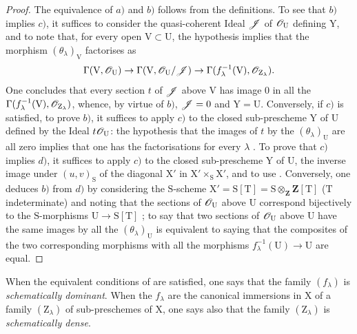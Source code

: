 \begin{proof}
The equivalence of $a)$ and $b)$ follows from the definitions.
To see that $b)$ implies $c)$, it suffices to consider the quasi-coherent Ideal $\mathscr{J}$ of $\mathscr{O}_\mathrm{U}$ defining $\mathrm{Y}$, and to note that, for every open $\mathrm{V}\subset\mathrm{U}$, the hypothesis implies that the morphism $(\theta_\lambda)_\mathrm{V}$ factorises as
\[
  \Gamma(\mathrm{V},\mathscr{O}_\mathrm{U})\to\Gamma(\mathrm{V},\mathscr{O}_\mathrm{U}/\mathscr{J})\to\Gamma(f_\lambda^{-1}(\mathrm{V}),\mathscr{O}_{\mathrm{Z}_\lambda}).
\]
One concludes that every section $t$ of $\mathscr{J}$ above $\mathrm{V}$ has image $0$ in all the $\Gamma(f_\lambda^{-1}(\mathrm{V}),\mathscr{O}_{\mathrm{Z}_\lambda})$, whence, by virtue of $b)$, $\mathscr{J}=0$ and $\mathrm{Y}=\mathrm{U}$.
Conversely, if $c)$ is satisfied, to prove $b)$, it suffices to apply $c)$ to the closed sub-prescheme $\mathrm{Y}$ of $\mathrm{U}$ defined by the Ideal $t\mathscr{O}_\mathrm{U}$: the hypothesis that the images of $t$ by the $(\theta_\lambda)_\mathrm{U}$ are all zero implies that one has the factorisations  for every $\lambda$ .
To prove that $c)$ implies $d)$, it suffices to apply $c)$ to the closed sub-prescheme $\mathrm{Y}$ of $\mathrm{U}$, the inverse image under $(u,v)_\mathrm{S}$ of the diagonal $\mathrm{X}'$ in $\mathrm{X}'\times_\mathrm{S}\mathrm{X}'$, and to use .
Conversely, one deduces $b)$ from $d)$ by considering the $\mathrm{S}$-scheme $\mathrm{X}'=\mathrm{S}[\mathrm{T}]=\mathrm{S}\otimes_\mathbf{Z}\mathbf{Z}[\mathrm{T}]$ ($\mathrm{T}$ indeterminate) and noting that the sections of $\mathscr{O}_\mathrm{U}$ above $\mathrm{U}$ correspond bijectively to the $\mathrm{S}$-morphisms $\mathrm{U}\to\mathrm{S}[\mathrm{T}]$ ; to say that two sections of $\mathscr{O}_\mathrm{U}$ above $\mathrm{U}$ have the same images by all the $(\theta_\lambda)_\mathrm{U}$ is equivalent to saying that the composites of the two corresponding morphisms with all the morphisms $f_\lambda^{-1}(\mathrm{U})\to\mathrm{U}$ are equal.
\end{proof}

\begin{definition}[11.10.2]
\label{IV.11.10.2}
When the equivalent conditions of  are satisfied, one says that the family $(f_\lambda)$ is \emph{schematically dominant}.
When the $f_\lambda$ are the canonical immersions in $\mathrm{X}$ of a family $(\mathrm{Z}_\lambda)$ of sub-preschemes of $\mathrm{X}$, one says also that the family $(\mathrm{Z}_\lambda)$ is \emph{schematically dense}.
\end{definition}


